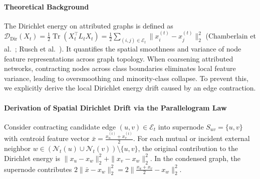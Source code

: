 \documentclass[sigconf]{acmart}
\begin{document}
\paragraph{Theoretical Background}
The Dirichlet energy on attributed graphs is defined as $\mathcal{D}_{\text{Dir}}(X_t) = \frac{1}{2} \operatorname{Tr}(X_t^\top L_t X_t) = \frac{1}{2} \sum_{(i, j) \in \mathcal{E}_t} \|x_i^{(t)} - x_j^{(t)}\|_2^2$ (Chamberlain et al.~\cite{chamberlain2021grand}; Rusch et al.~\cite{rusch2023survey}). It quantifies the spatial smoothness and variance of node feature representations across graph topology. When coarsening attributed networks, contracting nodes across class boundaries eliminates local feature variance, leading to oversmoothing and minority-class collapse. To prevent this, we explicitly derive the local Dirichlet energy drift caused by an edge contraction.

\paragraph{Derivation of Spatial Dirichlet Drift via the Parallelogram Law}
Consider contracting candidate edge $(u, v) \in \mathcal{E}_t$ into supernode $S_{uv} = \{u, v\}$ with centroid feature vector $\bar{x} = \frac{x_u^{(t)} + x_v^{(t)}}{2}$. For each mutual or incident external neighbor $w \in (\mathcal{N}_t(u) \cup \mathcal{N}_t(v)) \setminus \{u, v\}$, the original contribution to the Dirichlet energy is $\|x_u - x_w\|_2^2 + \|x_v - x_w\|_2^2$. In the condensed graph, the supernode contributes $2 \|\bar{x} - x_w\|_2^2 = 2 \|\frac{x_u + x_v}{2} - x_w\|_2^2$.
\end{document}
